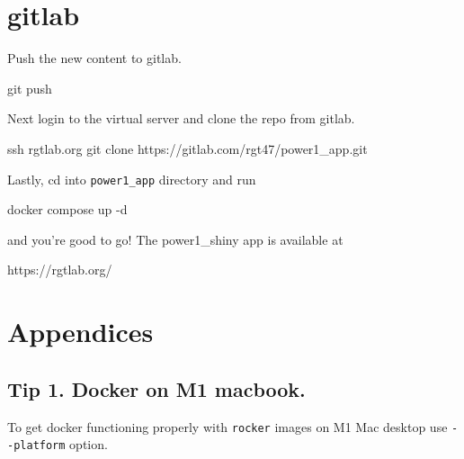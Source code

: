 \documentclass[
  letterpaper,
  DIV=11,
  numbers=noendperiod,
  oneside]{scrartcl}
\newenvironment{Shaded}{\begin{snugshade}}{\end{snugshade}}
\newcommand{\AttributeTok}[1]{\textcolor[rgb]{0.40,0.45,0.13}{#1}}
\newcommand{\ExtensionTok}[1]{\textcolor[rgb]{0.00,0.23,0.31}{#1}}
\newcommand{\FunctionTok}[1]{\textcolor[rgb]{0.28,0.35,0.67}{#1}}
\newcommand{\NormalTok}[1]{\textcolor[rgb]{0.00,0.23,0.31}{#1}}
\begin{document}
\hypertarget{gitlab}{%
\section{gitlab}\label{gitlab}}

Push the new content to gitlab.

\begin{Shaded}
\begin{Highlighting}[]
\FunctionTok{git}\NormalTok{ push}
\end{Highlighting}
\end{Shaded}

Next login to the virtual server and clone the repo from gitlab.

\begin{Shaded}
\begin{Highlighting}[]
\FunctionTok{ssh}\NormalTok{ rgtlab.org}
\FunctionTok{git}\NormalTok{ clone https://gitlab.com/rgt47/power1\_app.git}
\end{Highlighting}
\end{Shaded}

Lastly, cd into \texttt{power1\_app} directory and run

\begin{Shaded}
\begin{Highlighting}[]
\ExtensionTok{docker}\NormalTok{ compose up }\AttributeTok{{-}d}
\end{Highlighting}
\end{Shaded}

and you're good to go! The power1\_shiny app is available at

\begin{Shaded}
\begin{Highlighting}[]
\ExtensionTok{https://rgtlab.org/}
\end{Highlighting}
\end{Shaded}

\hypertarget{appendices}{%
\section{Appendices}\label{appendices}}

\hypertarget{tip-1.-docker-on-m1-macbook.}{%
\subsection{Tip 1. Docker on M1
macbook.}\label{tip-1.-docker-on-m1-macbook.}}

To get docker functioning properly with \texttt{rocker} images on M1 Mac
desktop use \texttt{-\/-platform} option.
\end{document}
